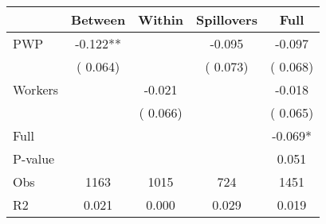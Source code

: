 
\begin{tabular}{l*{4}{c}}\hline&\multicolumn{1}{c}{Between}&\multicolumn{1}{c}{Within}&\multicolumn{1}{c}{Spillovers}&\multicolumn{1}{c}{Full}\\ \hline
 PWP           &             -0.122**      &                                               &       -0.095 &        -0.097                            \\ 
                               &        (       0.064)           &                                       &       (       0.073)     &      (       0.068)                                           \\ 
 Workers       &                                               &       -0.021    &                                &            -0.018                            \\ 
                               &                                               & (       0.066)                  &                                        &      (       0.065)                                           \\ 
\hline                                                                                                                                                                                                                                            
 Full                  &                                               &                                               &                                        &            -0.069*                                     \\ 
 P-value               &                                               &                                               &                                        &             0.051                                           \\ 
 Obs                   &               1163               &       1015                       &       724                &              1451                                               \\ 
 R2                    &                      0.021              &              0.000                      &              0.029               &                     0.019                                              \\ 
\hline \end{tabular}                                                                                                                                                                                                              